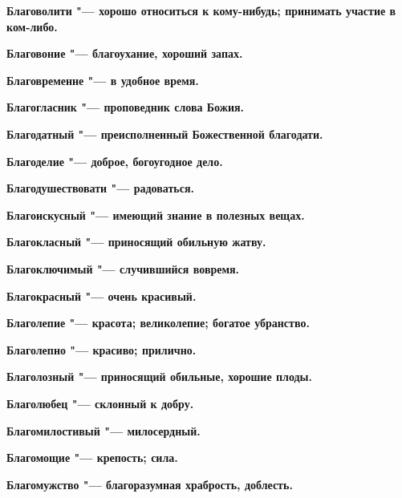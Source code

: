 \begin{multicols}{2}
\bfseries Благоволити\normalfont{} "--- хорошо относиться к кому-нибудь; принимать участие в ком-либо. 




\bfseries Благовоние\normalfont{} "--- благоухание, хороший запах. 




\bfseries Благовременне\normalfont{} "--- в удобное время. 




\bfseries Благогласник\normalfont{} "--- проповедник слова Божия. 




\bfseries Благодатный\normalfont{} "--- преисполненный Божественной благодати. 




\bfseries Благоделие\normalfont{} "--- доброе, богоугодное дело. 




\bfseries Благодушествовати\normalfont{} "--- радоваться. 




\bfseries Благоискусный\normalfont{} "--- имеющий знание в полезных вещах. 




\bfseries Благокласный\normalfont{} "--- приносящий обильную жатву. 




\bfseries Благоключимый\normalfont{} "--- случившийся вовремя. 




\bfseries Благокрасный\normalfont{} "--- очень красивый. 




\bfseries Благолепие\normalfont{} "--- красота; великолепие; богатое убранство. 




\bfseries Благолепно\normalfont{} "--- красиво; прилично. 




\bfseries Благолозный\normalfont{} "--- приносящий обильные, хорошие плоды. 




\bfseries Благолюбец\normalfont{} "--- склонный к добру. 




\bfseries Благомилостивый\normalfont{} "--- милосердный. 




\bfseries Благомощие\normalfont{} "--- крепость; сила. 




\bfseries Благомужство\normalfont{} "--- благоразумная храбрость, доблесть. 





\end{multicols}
